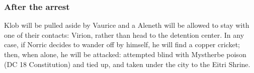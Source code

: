 \begin{itemize}
\begin{itemize}
\end{itemize}

\subsubsection{After the arrest}
Klob will be pulled aside by Vaurice and a
Aleneth will be allowed to stay with one of their contacts: Virion, rather than head to the detention center. In any case, if Norric decides to wander off by himself, he will find a copper cricket; then, when alone, he will be attacked: attempted blind with Mystherbe poison (DC 18 Constitution) and tied up, and taken under the city to the Eitri Shrine. 



